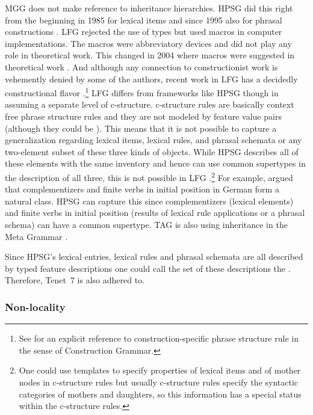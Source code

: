 \documentclass[output=paper]{langsci/langscibook}
\begin{document}
MGG does not make reference to inheritance hierarchies. HPSG did this right from the beginning in 1985 \citep{FPW85a} for lexical items and
since 1995 also for phrasal constructions \citep{Sag97a}. LFG rejected the use of types but used
macros in computer implementations. The macros were abbreviatory devices and did not play any role in
theoretical work. This changed in 2004 where macros were suggested in theoretical work
\citep*{DKK2004a}. And although any connection to constructionist work is vehemently denied by some
of the authors, recent work in LFG has a decidedly constructional flavor
\citep*{ADT2008a,AGT2014a}.\footnote{
  See  for an explicit reference to construction-specific phrase
  structure rule in the sense of Construction Grammar.
}
LFG differs from frameworks like HPSG though in assuming a separate level of
c-structure. c-structure rules are basically context free phrase structure rules and they are not
modeled by feature value pairs (although they could be \citep{Kaplan95a}). This means that it is not
possible to capture a generalization regarding lexical items, lexical rules, and phrasal
schemata or any two-element subset of these three kinds of objects. While HPSG describes all of
these elements with the same inventory and hence can use common supertypes in the description of all
three, this is not possible in LFG \citep[Section~23.1]{MuellerGT-Eng2}.\footnote{
  One could use templates \citep{DKK2004a,ADT2013a} to specify properties of lexical items and of mother nodes in c-structure
  rules but usually c-structure rules specify the syntactic categories of mothers and daughters, so
  this information has a special status within the c-structure rules.
} For example, \citet{Hoehle97a} argued that
complementizers and finite verbs in initial position in German form a natural class. HPSG can
capture this since complementizers (lexical elements) and finite verbs in initial position (results
of lexical rule applications or a phrasal schema) can have a common supertype.
TAG is also using inheritance in the Meta Grammar \citep{LK2017a}.

Since HPSG's lexical entries, lexical rules and phrasal schemata are all described by typed feature
descriptions one could call the set of these descriptions the . Therefore,
Tenet~7 is also adhered to. 

\subsubsection{Non-locality}
\label{sec-locality}
\end{document}
